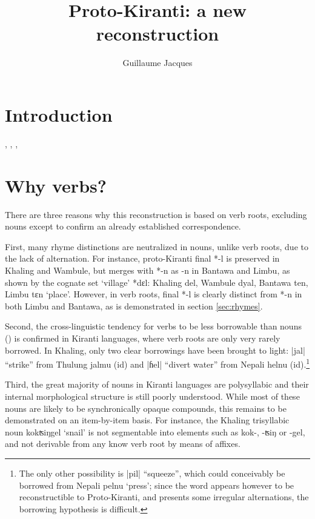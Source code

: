 \documentclass[oldfontcommands,oneside,a4paper,11pt]{article}
\newcommand{\ipa}[1]{{\phon \mbox{#1}}} %
\newcommand{\dhatu}[2]{|\ipa{#1}| ``#2''}
\begin{document}
\title{Proto-Kiranti: a new reconstruction}
\author{Guillaume Jacques}
\maketitle

\section{Introduction}
\citet{starostin94kiranti}, \citet{michailovsky94stops}, \citet{opgenort05jero}, \citet{michailovsky10kiranti}

\citet{opgenort04wambule}
\citet{doornenbal09}
\citet{michailovsky02dico}
\citet{jacques15khaling}
\citet{jacques12khaling}
 
\section{Why verbs?}

There are three reasons why this reconstruction is based on verb roots, excluding nouns except to confirm an already established correspondence.

First,  many rhyme distinctions are neutralized in nouns, unlike verb roots, due to the lack of alternation. For instance, proto-Kiranti final *\ipa{-l} is preserved in Khaling and Wambule, but merges with *\ipa{-n} as \ipa{-n} in Bantawa and Limbu, as shown by the cognate set `village' *\ipa{dɛl}: Khaling \ipa{del}, Wambule \ipa{dyal}, Bantawa \ipa{ten}, Limbu \ipa{tɛn} `place'. However, in verb roots, final *\ipa{-l} is clearly distinct from *\ipa{-n} in both Limbu and Bantawa, as is demonstrated in section \ref{sec:rhymes}.

Second, the cross-linguistic tendency for verbs to be less borrowable than nouns (\citealt{wohlgemuth09verbal}) is confirmed in Kiranti languages, where verb roots are only very rarely borrowed. In Khaling, only two clear borrowings have been brought to light: \dhatu{jal}{strike} from Thulung \ipa{jalmu}  (id) and \dhatu{ɦel}{divert water} from Nepali \ipa{helnu} (id).\footnote{The only other possibility is  \dhatu{pil}{squeeze}, which could conceivably be borrowed from Nepali \ipa{pelnu} `press'; since the word appears however to be reconstructible to Proto-Kiranti, and presents some irregular alternations, the borrowing hypothesis is difficult.} 

Third, the great majority of nouns in Kiranti languages are polysyllabic and their internal morphological structure is still poorly understood. While most of these nouns are likely to be synchronically opaque compounds, this remains to be demonstrated on an item-by-item basis.  For instance, the Khaling trisyllabic noun \ipa{kokʦiŋgel} `snail' is not segmentable into elements such as \ipa{kok-}, \ipa{-ʦiŋ} or \ipa{-gel}, and not derivable from any know verb root by means of affixes.
\end{document}
